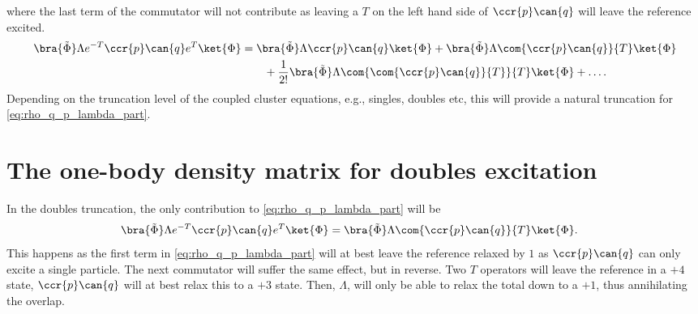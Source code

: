     where the last term of the commutator will not contribute as leaving a $T$
    on the left hand side of $\ccr{p}\can{q}$ will leave the reference excited.
    \begin{align}
        \bra{\tilde{\Phi}}\Lambda e^{-T}\ccr{p}\can{q}e^T\ket{\Phi}
        &= \bra{\tilde{\Phi}}\Lambda \ccr{p}\can{q}\ket{\Phi}
        + \bra{\tilde{\Phi}}\Lambda \com{\ccr{p}\can{q}}{T}\ket{\Phi}
        \nonumber \\
        &\qquad
        + \frac{1}{2!}
        \bra{\tilde{\Phi}}\Lambda \com{\com{\ccr{p}\can{q}}{T}}{T}\ket{\Phi}
        + \dots.
        \label{eq:rho_q_p_lambda_part}
    \end{align}
    Depending on the truncation level of the coupled cluster equations, e.g.,
    singles, doubles etc, this will provide a natural truncation for
    \autoref{eq:rho_q_p_lambda_part}.

    \section{The one-body density matrix for doubles excitation}
        In the doubles truncation, the only contribution to
        \autoref{eq:rho_q_p_lambda_part} will be
        \begin{align}
            \bra{\tilde{\Phi}}\Lambda e^{-T}\ccr{p}\can{q}e^T\ket{\Phi}
            &= \bra{\tilde{\Phi}}\Lambda \com{\ccr{p}\can{q}}{T}\ket{\Phi}.
        \end{align}
        This happens as the first term in \autoref{eq:rho_q_p_lambda_part} will
        at best leave the reference relaxed by $1$ as $\ccr{p}\can{q}$ can only
        excite a single particle. The next commutator will suffer the same
        effect, but in reverse. Two $T$ operators will leave the reference in a
        $+4$ state, $\ccr{p}\can{q}$ will at best relax this to a $+3$ state.
        Then, $\Lambda$, will only be able to relax the total down to a $+1$,
        thus annihilating the overlap.

